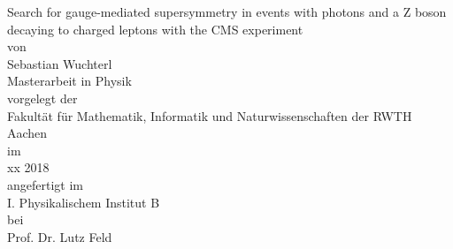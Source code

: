 \vspace{1.5cm}
\begin{center}
\Huge
Search for gauge-mediated supersymmetry in events with photons and a Z boson decaying to charged leptons with the CMS experiment
\\
\vspace{1.5cm}
\normalsize
von\\
\LARGE
Sebastian Wuchterl\\
\vspace{1.0cm}
\Large
Masterarbeit in Physik\\
\vspace{1.5cm}
\normalsize
vorgelegt der \\
\Large
Fakult\"at f\"ur Mathematik, Informatik und Naturwissenschaften der RWTH Aachen\\
\vspace{1.5cm}
\normalsize
im\\
\Large
xx 2018\\
\vspace{1.5cm}
\normalsize
angefertigt im\\
\Large
I. Physikalischem Institut B\\
\vspace{1.5cm}
\normalsize
bei\\
\Large
Prof. Dr. Lutz Feld
\end{center}
\thispagestyle{empty}
\restoregeometry
\newpage
